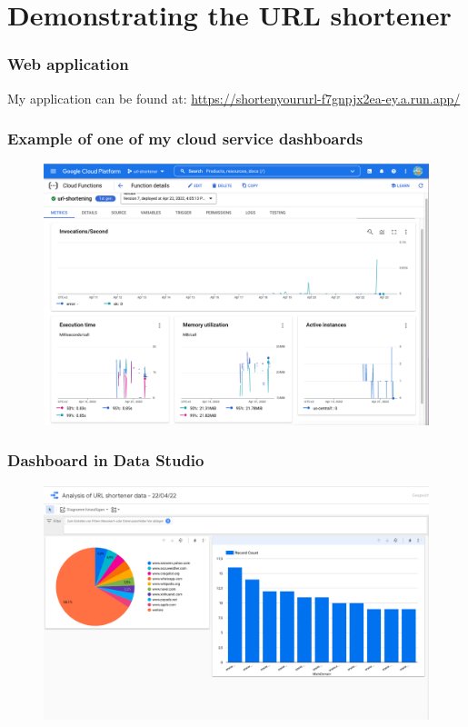 \documentclass[aspectratio=169,16pt]{beamer}
\begin{document}
\section{Demonstrating the URL shortener}
\begin{frame}
    \frametitle{Web application}
    \begin{block}{\scriptsize My application can be found at:} \scriptsize
        \href{https://shortenyoururl-f7gnpjx2ea-ey.a.run.app/}{https://shortenyoururl-f7gnpjx2ea-ey.a.run.app/}
    \end{block}
\end{frame}

\begin{frame}
    \frametitle{Example of one of my cloud service dashboards}
    \begin{figure}
        \includegraphics[height=0.75\paperheight]{cloudFunctionDashboard}
    \end{figure}
\end{frame}

\begin{frame}
    \frametitle{Dashboard in Data Studio}
    \begin{figure}
        \includegraphics[height=0.75\paperheight]{dataStudioDashboard}
    \end{figure}
\end{frame}
\end{document}
